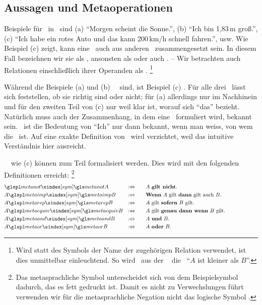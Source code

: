 \subsection{Aussagen und Metaoperationen}%
\label{sub:AussagenUndMetaoperationen}

Beispiele für \ in \Metasprache\ sind
(a) \enquote{Morgen scheint die Sonne.},
(b) \enquote{Ich bin 1,83\,m groß.},
(c) \enquote{Ich habe ein rotes Auto und das kann 200\,km/h schnell fahren.}, usw.
Wie Beispiel (c) zeigt, kann eine \Aussage\ auch aus anderen \Aussagen\ zusammengesetzt sein.
In diesem Fall bezeichnen wir sie als , ansonsten als  oder auch .
-- Wir betrachten auch Relationen einschließlich ihrer Operanden als \Aussagen.%
\footnote{%
	Wird statt des Symbols der Name der zugehörigen Relation verwendet, ist dies unmittelbar einleuchtend.
	So wird \textzB\ aus der \Formel\  die \Aussage\ \enquote{$A$ ist kleiner als $B$}.
}

Während die Beispiele (a) und (b) \unzerlegbare\ \Aussagen\ sind, ist Beispiel (c) \zerlegbar.
Für alle drei \Aussagen\ lässt sich feststellen, ob sie richtig sind oder nicht;
für (a) allerdings nur im Nachhinein und für den zweiten Teil von (c) nur weil klar ist, worauf sich \enquote{das} bezieht.
Natürlich muss auch der Zusammenhang, in dem eine \Aussage\ formuliert wird, bekannt sein.
\textZB\ ist die Bedeutung von \enquote{Ich} nur dann bekannt, wenn man weiss, von wem die \Aussage\ ist.
Auf eine exakte Definition von \Aussage\ wird verzichtet, weil das intuitive Verständnis hier ausreicht.

\Zerlegbare\ \Aussagen\ wie (c) können zum Teil formalisiert werden.
Dies wird mit den folgenden Definitionen erreicht:%
\footnote{%
	Das metasprachliche Symbol  unterscheidet sich von dem Beispielsymbol  dadurch, das es fett gedruckt ist.
	Damit es nicht zu Verwechslungen führt verwenden wir für die metasprachliche Negation nicht das logische Symbol .
}
\begin{align}
	&   \glsSym{metanot}   A & \metadefeq & \qquad
	\text{$A$ \defn{gilt nicht}.}
	\\
	& A \glsSym{metaimp}   B & \metadefeq & \qquad
	\text{\defn{Wenn} $A$ gilt \defn{dann} gilt auch $B$.}
	\\
	& A \glsSym{metarep}   B & \metadefeq & \qquad
	\text{$A$ gilt \defn{sofern} $B$ gilt.}
	\\
	& A \glsSym{metaequiv} B & \metadefeq & \qquad
	\text{$A$ gilt \defn{genau dann wenn} $B$ gilt.}
	\\
	& A \glsSym{metaand}   B & \metadefeq & \qquad
	\text{$A$ \defn{und}  $B$.}
	\\
	& A \glsSym{metaor}    B & \metadefeq & \qquad
	\text{$A$ \defn{oder} $B$.}
	\formulatoleft
\end{align}

